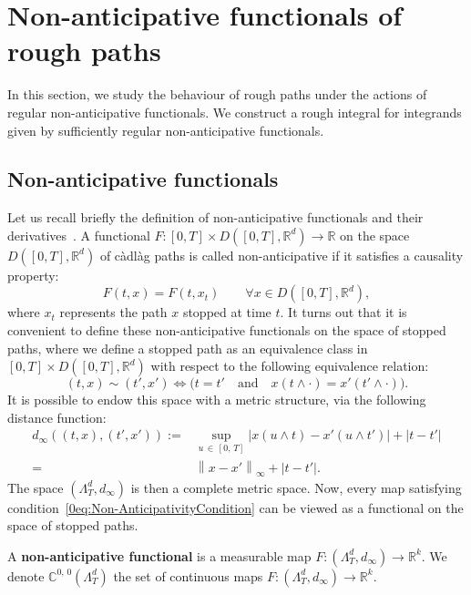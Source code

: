 \documentclass[AHL,Unicode,longabstracts,published]{cedram}
\newcommand{\cadlag}{càdlàg }
\newcommand{\bbC}{\mathbb{C}}
\newcommand{\Rr}{{\mathbb{R}}}
\let\oldforall\forall
\renewcommand*{\forall}{\mathrel{\oldforall}}
\begin{document}
\section{Non-anticipative functionals of rough paths}\label{chp:actions}
In this section, we study the behaviour of rough paths under the actions of regular non-anticipative functionals. We construct a rough integral for integrands given by sufficiently regular non-anticipative functionals.

\subsection{Non-anticipative functionals}
Let us recall briefly the definition of non-anticipative functionals and their derivatives~\cite{cont2012}. A functional $F:[0, T] \times D([0, T], \Rr^d) \rightarrow \Rr$ on the space $D([0, T], \Rr^d)$ of \cadlag paths is called non-anticipative if it satisfies a causality property:
\begin{equation}\label{0eq:Non-AnticipativityCondition}
F(t, x) = F(t, {x}_t) \qquad \forall {x} \in D\left([0, T], \Rr^d\right),
\end{equation}
where ${x}_t$ represents the path ${x}$ stopped at time $t$. It turns out that it is convenient to define these non-anticipative functionals on the space of stopped paths, where we define a stopped path as an equivalence class in $[0, T] \times D([0, T], \Rr^d)$ with respect to the following equivalence relation:
\[
(t, {x}) \sim \left(t', {x}'\right) \Longleftrightarrow \big(t = t' \quad \text{and} \quad {x}(t \wedge \cdot) = {x}'\left(t'\wedge \cdot\right)\big).
\]
It is possible to endow this space with a metric structure, via the following distance function:
\begin{align*}
d_\infty\left((t, {x}), \left(t', {x}'\right)\right) :=& \sup_{u\,\in\,[0,\,T]} \left|{x}(u \wedge t) - {x}'\left(u \wedge t'\right)\right| + \left|t - t'\right| \\
=& \left\|{x} - {x}'\right\|_\infty + \left|t-t'\right|.
\end{align*}
The space $(\Lambda_T^d, d_\infty)$ is then a complete metric space. Now, every map satisfying condition~\eqref{0eq:Non-AnticipativityCondition} can be viewed as a functional on the space of stopped paths.
\begin{defi} A \textbf{non-anticipa\-tive functional} is a measurable map $F: (\Lambda_T^d, d_\infty) \rightarrow \Rr^k$.
We denote $\bbC^{0,\,0}(\Lambda_T^d)$ the set of continuous maps $F: (\Lambda_T^d, d_\infty) \rightarrow \Rr^k$.
\end{defi}
\end{document}
